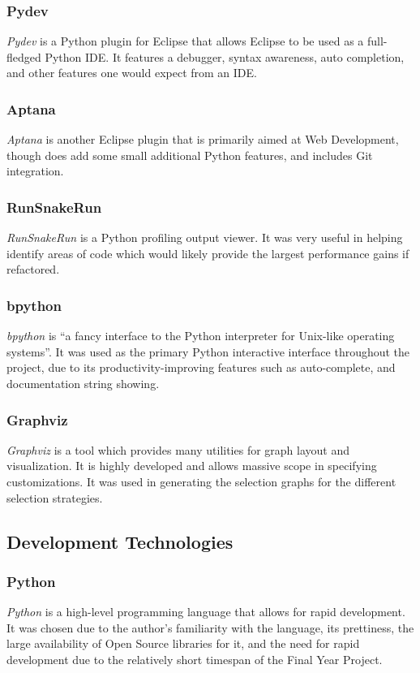 \documentclass[a4paper,11pt]{report}
\begin{document}
\subsubsection*{Pydev}
\emph{Pydev} \citep{prog:pydev} is a Python plugin for Eclipse that allows Eclipse to be used as a full-fledged Python IDE. It features a debugger, syntax awareness, auto completion, and other features one would expect from an IDE.

\subsubsection*{Aptana}
\emph{Aptana} \citep{prog:aptana} is another Eclipse plugin that is primarily aimed at Web Development, though does add some small additional Python features, and includes Git integration.

\subsubsection*{RunSnakeRun}
\emph{RunSnakeRun} \citep{prog:runsnakerun} is a Python profiling output viewer. It was very useful in helping identify areas of code which would likely provide the largest performance gains if refactored.

\subsubsection*{bpython}
\emph{bpython} \citep{prog:bpython} is ``a fancy interface to the Python interpreter for Unix-like operating systems''. It was used as the primary Python interactive interface throughout the project, due to its productivity-improving features such as auto-complete, and documentation string showing.

\subsubsection*{Graphviz}
\emph{Graphviz} \citep{prog:graphviz} is a tool which provides many utilities for graph layout and visualization. It is highly developed and allows massive scope in specifying customizations. It was used in generating the selection graphs for the different selection strategies. 

\subsection{Development Technologies}

\subsubsection*{Python}
\emph{Python} \citep{prog:python} is a high-level programming language that allows for rapid development. It was chosen due to the author's familiarity with the language, its prettiness, the large availability of Open Source libraries for it, and the need for rapid development due to the relatively short timespan of the Final Year Project.
\end{document}
